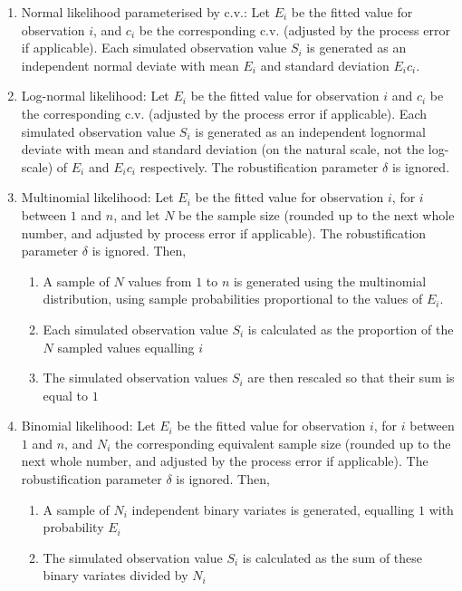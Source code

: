 \begin{enumerate}
  \item{} Normal likelihood parameterised by c.v.: Let $E_{i}$ be the fitted value for observation $i$, and $c_i$ be the corresponding c.v. (adjusted by the process error if applicable). Each simulated observation value $S_i$ is generated as an independent normal deviate with mean $E_i$ and standard deviation $E_i c_i$.
  \item{} Log-normal likelihood: Let $E_i$ be the fitted value for observation $i$ and $c_i$ be the corresponding c.v. (adjusted by the process error if applicable). Each simulated observation value $S_i$ is generated as an independent lognormal deviate with mean and standard deviation (on the natural scale, not the log-scale) of $E_i$ and $E_i c_i$ respectively. The robustification parameter $\delta$ is ignored.
  \item{} Multinomial likelihood: Let $E_i$ be the fitted value for observation $i$, for $i$ between $1$ and $n$, and let $N$ be the sample size (rounded up to the next whole number, and adjusted by process error if applicable). The robustification parameter $\delta$ is ignored. Then, 
  \begin{enumerate}
    \item{} A sample of $N$ values from $1$ to $n$ is generated using the multinomial distribution, using sample probabilities proportional to the values of $E_i$.
    \item{} Each simulated observation value $S_i$ is calculated as the proportion of the $N$ sampled values equalling $i$
    \item{} The simulated observation values $S_i$ are then rescaled so that their sum is equal to $1$
  \end{enumerate}
\item{} Binomial likelihood: Let $E_i$ be the fitted value for observation $i$, for $i$ between $1$ and $n$, and $N_i$ the corresponding equivalent sample size (rounded up to the next whole number, and adjusted by the process error if applicable). The robustification parameter $\delta$ is ignored. Then, 
  \begin{enumerate}
    \item{} A sample of $N_i$ independent binary variates is generated, equalling $1$ with probability $E_i$ 
    \item{}	The simulated observation value $S_i$ is calculated as the sum of these binary variates divided by $N_i$
  \end{enumerate}
\end{enumerate}

